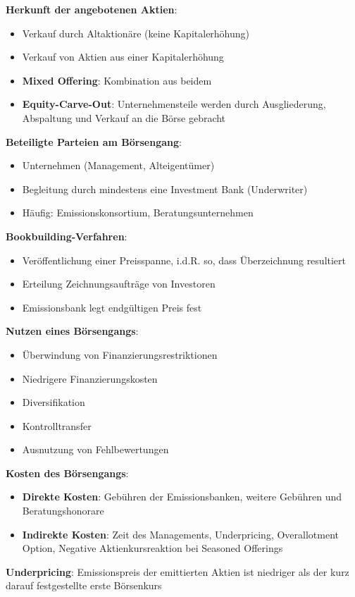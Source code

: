 \textbf{Herkunft der angebotenen Aktien}:
\begin{itemize}
	\item Verkauf durch Altaktionäre (keine Kapitalerhöhung)
	\item Verkauf von Aktien aus einer Kapitalerhöhung
	\item \textbf{Mixed Offering}: Kombination aus beidem
	\item \textbf{Equity-Carve-Out}: Unternehmensteile werden durch Ausgliederung, Abspaltung und Verkauf an die Börse gebracht
\end{itemize}
\bigskip
\textbf{Beteiligte Parteien am Börsengang}:
\begin{itemize}
	\item Unternehmen (Management, Alteigentümer)
	\item Begleitung durch mindestens eine Investment Bank (Underwriter)
	\item Häufig: Emissionskonsortium, Beratungsunternehmen
\end{itemize}
\pagebreak
\textbf{Bookbuilding-Verfahren}:
\begin{itemize}
	\item Veröffentlichung einer Preisspanne, i.d.R. so, dass Überzeichnung resultiert
	\item Erteilung Zeichnungsaufträge von Investoren
	\item Emissionsbank legt endgültigen Preis fest
\end{itemize}
\bigskip
\textbf{Nutzen eines Börsengangs}:
\begin{itemize}
	\item Überwindung von Finanzierungsrestriktionen
	\item Niedrigere Finanzierungskosten
	\item Diversifikation
	\item Kontrolltransfer
	\item Ausnutzung von Fehlbewertungen
\end{itemize}

\textbf{Kosten des Börsengangs}:
\begin{itemize}
	\item \textbf{Direkte Kosten}: Gebühren der Emissionsbanken, weitere Gebühren und Beratungshonorare
	\item \textbf{Indirekte Kosten}: Zeit des Managements, Underpricing, Overallotment Option, Negative Aktienkursreaktion bei Seasoned Offerings
\end{itemize}
\bigskip
\textbf{Underpricing}: Emissionspreis der emittierten Aktien ist niedriger als der kurz darauf festgestellte erste Börsenkurs

